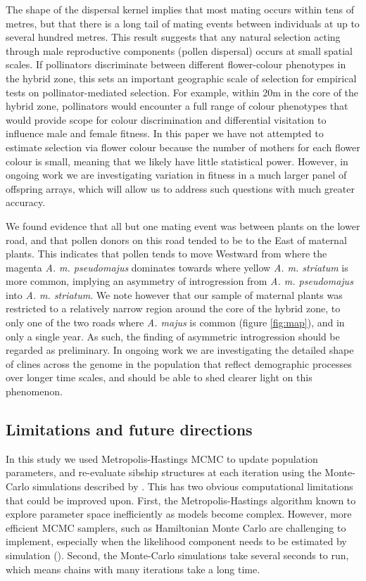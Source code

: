 \documentclass[10pt, a4paper, twocolumn]{article} %
\begin{document}
The shape of the dispersal kernel implies that most mating occurs within tens of metres, but that there is a long tail of mating events between individuals at up to several hundred metres. This result suggests that any natural selection acting through male reproductive components (pollen dispersal) occurs at small spatial scales. If pollinators discriminate between different flower-colour phenotypes in the hybrid zone, this sets an important geographic scale of selection for empirical tests on pollinator-mediated selection. For example, within 20m in the core of the hybrid zone, pollinators would encounter a full range of colour phenotypes that would provide scope for colour discrimination and differential visitation to influence male and female fitness. In this paper we have not attempted to estimate selection via flower colour because the number of mothers for each flower colour is small, meaning that we likely have little statistical power. However, in ongoing work we are investigating variation in fitness in a much larger panel of offspring arrays, which will allow us to address such questions with much greater accuracy.

We found evidence that all but one mating event was between plants on the lower road, and that pollen donors on this road tended to be to the East of maternal plants.
This indicates that pollen tends to move Westward from where the magenta \textit{A. m. pseudomajus} dominates towards where yellow \textit{A. m. striatum} is more common, implying an asymmetry of introgression from \textit{A. m. pseudomajus} into \textit{A. m. striatum}.
We note however that our sample of maternal plants was restricted to a relatively narrow region around the core of the hybrid zone, to only one of the two roads where \textit{A. majus} is common (figure \ref{fig:map}), and in only a single year.
As such, the finding of asymmetric introgression should be regarded as preliminary.
In ongoing work we are investigating the detailed shape of clines across the genome in the population that reflect demographic processes over longer time scales, and should be able to shed clearer light on this phenomenon.

\subsection{Limitations and future directions}

In this study we used Metropolis-Hastings MCMC to update population parameters, and re-evaluate sibship structures at each iteration using the Monte-Carlo simulations described by \textcite{ellis2018efficient}.
This has two obvious computational limitations that could be improved upon.
First, the Metropolis-Hastings algorithm known to explore parameter space inefficiently as models become complex.
However, more efficient MCMC samplers, such as Hamiltonian Monte Carlo are challenging to implement, especially when the likelihood component needs to be estimated by simulation (\cite{betancourt2017conceptual}).
Second, the Monte-Carlo simulations take several seconds to run, which means chains with many iterations take a long time.
\end{document}
